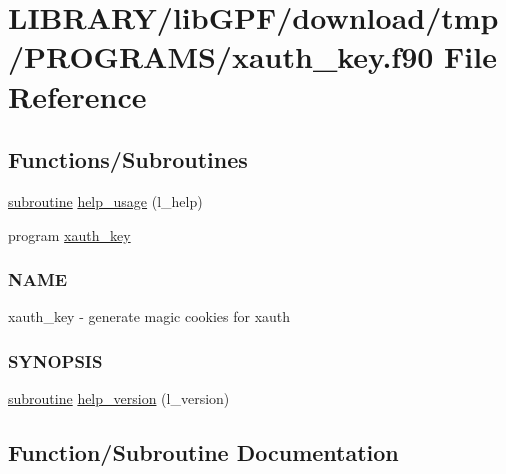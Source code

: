 \hypertarget{xauth__key_8f90}{}\section{L\+I\+B\+R\+A\+R\+Y/lib\+G\+P\+F/download/tmp/\+P\+R\+O\+G\+R\+A\+M\+S/xauth\+\_\+key.f90 File Reference}
\label{xauth__key_8f90}
\subsection*{Functions/\+Subroutines}
\begin{DoxyCompactItemize}
\item 
\hyperlink{M__stopwatch_83_8txt_acfbcff50169d691ff02d4a123ed70482}{subroutine} \hyperlink{xauth__key_8f90_a3e09a3b52ee8fb04eeb93fe5761626a8}{help\+\_\+usage} (l\+\_\+help)
\item 
program \hyperlink{xauth__key_8f90_a0f9a35aa83e47ebe911d6c02ac4f5798}{xauth\+\_\+key}
\begin{DoxyCompactList}\small\item\em \subsubsection*{N\+A\+ME}

xauth\+\_\+key -\/ generate magic cookies for xauth \subsubsection*{S\+Y\+N\+O\+P\+S\+IS}\end{DoxyCompactList}\item 
\hyperlink{M__stopwatch_83_8txt_acfbcff50169d691ff02d4a123ed70482}{subroutine} \hyperlink{xauth__key_8f90_ad2aaabc58e93e13e8a0d5acf843eb5d0}{help\+\_\+version} (l\+\_\+version)
\end{DoxyCompactItemize}


\subsection{Function/\+Subroutine Documentation}
\mbox{\label{xauth__key_8f90_a3e09a3b52ee8fb04eeb93fe5761626a8}} 
